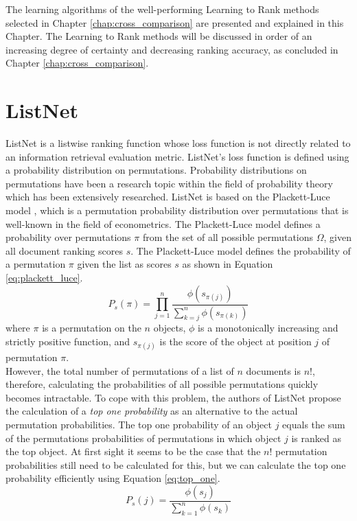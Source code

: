 \label{chap:ltr_methods}
The learning algorithms of the well-performing Learning to Rank methods selected in Chapter \ref{chap:cross_comparison} are presented and explained in this Chapter. The Learning to Rank methods will be discussed in order of an increasing degree of certainty and decreasing ranking accuracy, as concluded in Chapter \ref{chap:cross_comparison}.

\section{ListNet}
\label{sec:ltrmethods_listnet}
ListNet \cite{Cao2007} is a listwise ranking function whose loss function is not directly related to an information retrieval evaluation metric. ListNet's loss function is defined using a probability distribution on permutations. Probability distributions on permutations have been a research topic within the field of probability theory which has been extensively researched. ListNet is based on the Plackett-Luce model \cite{Plackett1975,Luce1959}, which is a permutation probability distribution over permutations that is well-known in the field of econometrics. The Plackett-Luce model defines a probability over permutations $\pi$ from the set of all possible permutations $\Omega$, given all document ranking scores $s$. The Plackett-Luce model defines the probability of a permutation $\pi$ given the list as scores $s$ as shown in Equation \ref{eq:plackett_luce}.
\begin{equation}
P_s(\pi) = \prod\limits_{j=1}^{n}\frac{\phi(s_{\pi(j)})}{\sum\nolimits_{k=j}^{n}\phi(s_{\pi(k)})}
\label{eq:plackett_luce}
\end{equation}
where $\pi$ is a permutation on the $n$ objects, $\phi$ is a monotonically increasing and strictly positive function, and $s_{\pi(j)}$ is the score of the object at position $j$ of permutation $\pi$.\\

However, the total number of permutations of a list of $n$ documents is $n!$, therefore, calculating the probabilities of all possible permutations quickly becomes intractable. To cope with this problem, the authors of ListNet propose the calculation of a \emph{top one probability} as an alternative to the actual permutation probabilities. The top one probability of an object $j$ equals the sum of the permutations probabilities of permutations in which object $j$ is ranked as the top object. At first sight it seems to be the case that the $n!$ permutation probabilities still need to be calculated for this, but we can calculate the top one probability efficiently using Equation \ref{eq:top_one}.
\begin{equation}
P_s(j) = \frac{\phi(s_j)}{\sum\nolimits_{k=1}^{n}\phi(s_k)}
\label{eq:top_one}
\end{equation}

